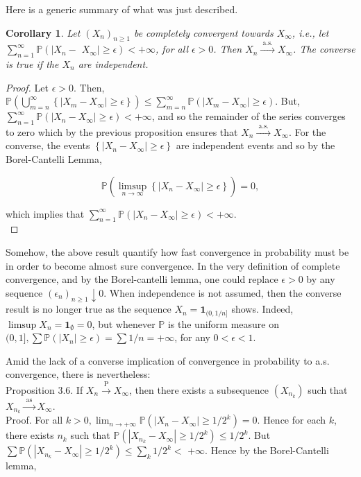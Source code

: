 \documentclass{amsbook}
\theoremstyle{plain}%
\newtheorem{cor}[thm]{Corollary}
\theoremstyle{definition}
\theoremstyle{remark}
\begin{document}
Here is a generic summary of what was just described.
\begin{cor}
  Let $\left(X_{n}\right)_{n \geq 1}$ be completely convergent towards $X_{\infty}$, i.e., let $\sum_{n=1}^{\infty} \mathbb{P}\left(\mid X_{n}-\right.$ $\left.X_{\infty} \mid \geq \epsilon\right)<+\infty$, for all $\epsilon>0$. Then $X_{n} \xrightarrow{\text { a.s. }} X_{\infty}$. The converse is true if the $X_{n}$ are independent.
\end{cor}

\begin{proof} Let $\epsilon>0$. Then, $\mathbb{P}\left(\bigcup_{m=n}^{\infty}\left\{\left|X_{m}-X_{\infty}\right| \geq \epsilon\right\}\right) \leq \sum_{m=n}^{\infty} \mathbb{P}\left(\left|X_{m}-X_{\infty}\right| \geq \epsilon\right)$. But, $\sum_{n=1}^{\infty} \mathbb{P}\left(\left|X_{n}-X_{\infty}\right| \geq \epsilon\right)<+\infty$, and so the remainder of the series converges to zero which by the previous proposition ensures that $X_{n} \xrightarrow{\text { a.s. }} X_{\infty}$. For the converse, the events $\left\{\left|X_{n}-X_{\infty}\right| \geq \epsilon\right\}$ are independent events and so by the Borel-Cantelli Lemma,

  $$
  \mathbb{P}\left(\limsup _{n \rightarrow \infty}\left\{\left|X_{n}-X_{\infty}\right| \geq \epsilon\right\}\right)=0,
  $$

  which implies that $\sum_{n=1}^{\infty} \mathbb{P}\left(\left|X_{n}-X_{\infty}\right| \geq \epsilon\right)<+\infty$.\\
\end{proof}
Somehow, the above result quantify how fast convergence in probability must be in order to become almost sure convergence. In the very definition of complete convergence, and by the Borel-cantelli lemma, one could replace $\epsilon>0$ by any sequence $\left(\epsilon_{n}\right)_{n \geq 1} \downarrow 0$. When independence is not assumed, then the converse result is no longer true as the sequence $X_{n}=\mathbf{1}_{(0,1 / n]}$ shows. Indeed, $\limsup X_{n}=\mathbf{1}_{\emptyset}=0$, but whenever $\mathbb{P}$ is the uniform measure on $(0,1], \sum \mathbb{P}\left(\left|X_{n}\right| \geq \epsilon\right)=\sum 1 / n=+\infty$, for any $0<\epsilon<1$.

Amid the lack of a converse implication of convergence in probability to a.s. convergence, there is nevertheless:\\

Proposition 3.6. If $X_{n} \xrightarrow{\mathrm{P}} X_{\infty}$, then there exists a subsequence $\left(X_{n_{k}}\right)$ such that $X_{n_{k}} \xrightarrow{\text { as }} X_{\infty}$.\\
Proof. For all $k>0, \lim _{n \rightarrow+\infty} \mathbb{P}\left(\left|X_{n}-X_{\infty}\right| \geq 1 / 2^{k}\right)=0$. Hence for each $k$, there exists $n_{k}$ such that $\mathbb{P}\left(\left|X_{n_{k}}-X_{\infty}\right| \geq 1 / 2^{k}\right) \leq 1 / 2^{k}$. But $\sum \mathbb{P}\left(\left|X_{n_{k}}-X_{\infty}\right| \geq 1 / 2^{k}\right) \leq \sum_{k} 1 / 2^{k}<$ $+\infty$. Hence by the Borel-Cantelli lemma,
\end{document}

